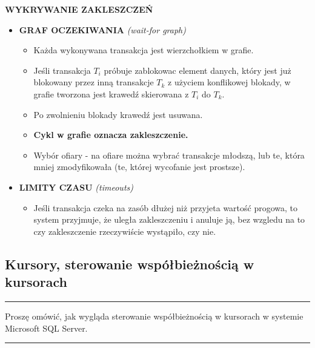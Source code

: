\documentclass[a5paper,6pt]{article}
\newcommand{\horrule}[1]{\rule{\linewidth}{#1}}
\begin{document}
    \textbf{WYKRYWANIE ZAKLESZCZEŃ}
    \begin{itemize}
        \item \textbf{GRAF OCZEKIWANIA} \textit{(wait-for graph)}
        \begin{itemize}
            \item Każda wykonywana transakcja jest wierzchołkiem w grafie.
            \item Jeśli transakcja $T_i$ próbuje zablokowac element danych,
                  który jest już blokowany przez inną transakcje $T_k$ z użyciem
                  konflikowej blokady, w grafie tworzona jest krawedź skierowana
                  z $T_i$ do $T_k$.
            \item Po zwolnieniu blokady krawedź jest usuwana.
            \item \textbf{Cykl w grafie oznacza zakleszczenie.}
            \item Wybór ofiary - na ofiare można wybrać transakcje młodszą, lub
                  te, która mniej zmodyfikowała (te, której wycofanie jest
                  prostsze).
        \end{itemize}

        \item \textbf{LIMITY CZASU} \textit{(timeouts)}
        \begin{itemize}
            \item Jeśli transakcja czeka na zasób dłużej niż przyjeta wartość
                  progowa, to system przyjmuje, że uległa zakleszczeniu i
                  anuluje ją, bez wzgledu na to czy zakleszczenie rzeczywiście
                  wystąpiło, czy nie.
        \end{itemize}
    \end{itemize}

\pagebreak

    \subsection{Kursory, sterowanie współbieżnością w kursorach} %
    \label{sub:kursory_sterowanie_wspolbieznoscia_w_kursorach}

    \horrule{0.5pt}
    Proszę omówić, jak wygląda sterowanie współbieżnością w kursorach w systemie
    Microsoft SQL Server.\\
    \horrule{0.5pt}
\end{document}
